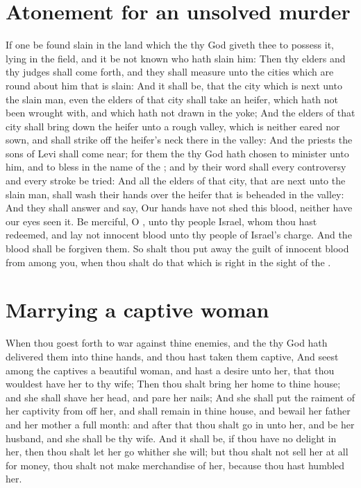 \section*{Atonement for an unsolved murder}
\begin{biblechapter} %
\verse If one be found slain in the land which the \LORD thy God giveth thee to possess it, lying in the field, and it be not known who hath slain him:
\verse Then thy elders and thy judges shall come forth, and they shall measure unto the cities which are round about him that is slain:
\verse And it shall be, that the city which is next unto the slain man, even the elders of that city shall take an heifer, which hath not been wrought with, and which hath not drawn in the yoke;
\verse And the elders of that city shall bring down the heifer unto a rough valley, which is neither eared nor sown, and shall strike off the heifer's neck there in the valley:
\verse And the priests the sons of Levi shall come near; for them the \LORD thy God hath chosen to minister unto him, and to bless in the name of the \LORD; and by their word shall every controversy and every stroke be tried:
\verse And all the elders of that city, that are next unto the slain man, shall wash their hands over the heifer that is beheaded in the valley:
\verse And they shall answer and say, Our hands have not shed this blood, neither have our eyes seen it.
\verse Be merciful, O \LORD, unto thy people Israel, whom thou hast redeemed, and lay not innocent blood unto thy people of Israel's charge. And the blood shall be forgiven them.
\verse So shalt thou put away the guilt of innocent blood from among you, when thou shalt do that which is right in the sight of the \LORD.
\section*{Marrying a captive woman}
\verse When thou goest forth to war against thine enemies, and the \LORD thy God hath delivered them into thine hands, and thou hast taken them captive,
\verse And seest among the captives a beautiful woman, and hast a desire unto her, that thou wouldest have her to thy wife;
\verse Then thou shalt bring her home to thine house; and she shall shave her head, and pare her nails;
\verse And she shall put the raiment of her captivity from off her, and shall remain in thine house, and bewail her father and her mother a full month: and after that thou shalt go in unto her, and be her husband, and she shall be thy wife.
\verse And it shall be, if thou have no delight in her, then thou shalt let her go whither she will; but thou shalt not sell her at all for money, thou shalt not make merchandise of her, because thou hast humbled her.

\end{biblechapter}
